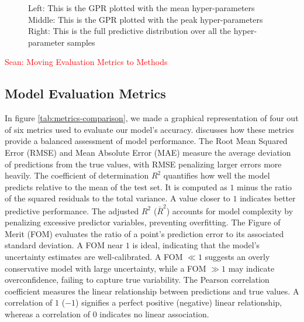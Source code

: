 \documentclass[11pt]{article}
\newcommand{\Sean}[1]{{\textcolor{red}{{Sean: #1}} }}
\begin{document}
\begin{figure}[H]
\begin{subfigure}[b]{0.3\textwidth}
    \end{subfigure}
    \caption{
        Left: This is the GPR plotted with the mean hyper-parameters
        Middle: This is the GPR plotted with the peak hyper-parameters
        Right: This is the full predictive distribution over all the hyper-parameter samples
     }
\end{figure}


\Sean{Moving Evaluation Metrics to Methods}
\subsection{Model Evaluation Metrics}
\label{sec:metrics}

In figure \ref{tab:metrics-comparison}, we made a graphical representation of four out of six metrics used to evaluate our model’s accuracy. \cite{bible} discusses how these metrics provide a balanced assessment of model performance.
The Root Mean Squared Error (RMSE) and Mean Absolute Error (MAE) measure the average deviation of predictions from the true values, with RMSE penalizing larger errors more heavily.
The coefficient of determination \( R^2 \) quantifies how well the model predicts relative to the mean of the test set. It is computed as \( 1 \) minus the ratio of the squared residuals to the total variance. A value closer to \( 1 \) indicates better predictive performance.
The adjusted \( R^2 \) (\(\bar{R}^2\)) accounts for model complexity by penalizing excessive predictor variables, preventing overfitting.
The Figure of Merit (FOM) evaluates the ratio of a point’s prediction error to its associated standard deviation. A FOM near \( 1 \) is ideal, indicating that the model’s uncertainty estimates are well-calibrated. A FOM \( \ll 1 \) suggests an overly conservative model with large uncertainty, while a FOM \( \gg 1 \) may indicate overconfidence, failing to capture true variability.
The Pearson correlation coefficient measures the linear relationship between predictions and true values. A correlation of \( 1 \) (\(-1\)) signifies a perfect positive (negative) linear relationship, whereas a correlation of \( 0 \) indicates no linear association.
\end{document}
